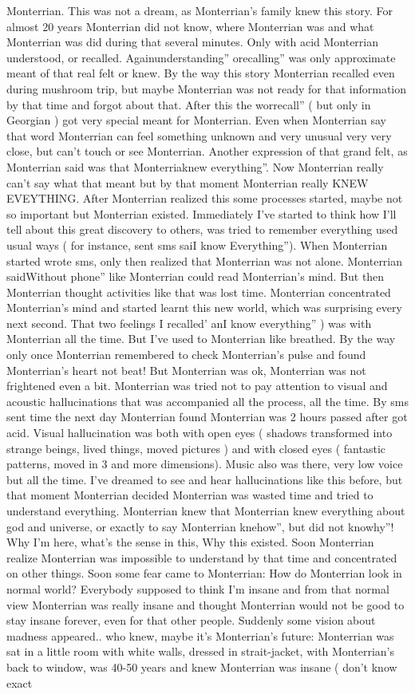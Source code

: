 \documentclass[12pt]{book}
\begin{document}
Monterrian. This was not a dream, as Monterrian's family knew this story. For almost 20 years Monterrian did not know, where Monterrian was and what Monterrian was did during that several minutes. Only with acid Monterrian understood, or recalled. Againunderstanding'' orecalling'' was only approximate meant of that real felt or knew. By the way this story Monterrian recalled even during mushroom trip, but maybe Monterrian was not ready for that information by that time and forgot about that. After this the worrecall'' ( but only in Georgian ) got very special meant for Monterrian. Even when Monterrian say that word Monterrian can feel something unknown and very unusual very very close, but can't touch or see Monterrian. Another expression of that grand felt, as Monterrian said was that Monterriaknew everything''. Now Monterrian really can't say what that meant but by that moment Monterrian really KNEW EVEYTHING. After Monterrian realized this some processes started, maybe not so important but Monterrian existed. Immediately I've started to think how I'll tell about this great discovery to others, was tried to remember everything used usual ways ( for instance, sent sms saiI know Everything''). When Monterrian started wrote sms, only then realized that Monterrian was not alone. Monterrian saidWithout phone'' like Monterrian could read Monterrian's mind. But then Monterrian thought activities like that was lost time. Monterrian concentrated Monterrian's mind and started learnt this new world, which was surprising every next second. That two feelings I recalled' anI know everything'' ) was with Monterrian all the time. But I've used to Monterrian like breathed. By the way only once Monterrian remembered to check Monterrian's pulse and found Monterrian's heart not beat! But Monterrian was ok, Monterrian was not frightened even a bit. Monterrian was tried not to pay attention to visual and acoustic hallucinations that was accompanied all the process, all the time. By sms sent time the next day Monterrian found Monterrian was 2 hours passed after got acid. Visual hallucination was both with open eyes ( shadows transformed into strange beings, lived things, moved pictures ) and with closed eyes ( fantastic patterns, moved in 3 and more dimensions). Music also was there, very low voice but all the time. I've dreamed to see and hear hallucinations like this before, but that moment Monterrian decided Monterrian was wasted time and tried to understand everything. Monterrian knew that Monterrian knew everything about god and universe, or exactly to say Monterrian knehow'', but did not knowhy''! Why I'm here, what's the sense in this, Why this existed. Soon Monterrian realize Monterrian was impossible to understand by that time and concentrated on other things. Soon some fear came to Monterrian: How do Monterrian look in normal world? Everybody supposed to think I'm insane and from that normal view Monterrian was really insane and thought Monterrian would not be good to stay insane forever, even for that other people. Suddenly some vision about madness appeared.. who knew, maybe it's Monterrian's future: Monterrian was sat in a little room with white walls, dressed in strait-jacket, with Monterrian's back to window, was 40-50 years and knew Monterrian was insane ( don't know exact 
\end{document}
